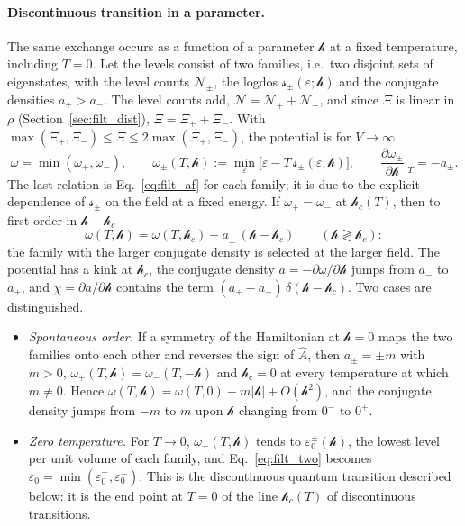 \documentclass[10pt,a4paper]{article}
\theoremstyle{plain}
\newcommand{\cN}{\mathcal{N}}   %
\newcommand{\lndos}{{logdos}}  %
\newcommand{\hfield}{\mathscr{h}}  %
\newcommand{\lds}{\mathscr{s}}  %
\begin{document}
\paragraph{Discontinuous transition in a parameter.} The same exchange
occurs as a function of a parameter $\hfield$ at a fixed temperature,
including $T=0$. Let the levels consist of two families, i.e.\ two disjoint
sets of eigenstates, with the level counts $\cN_\pm$, the \lndos{}
$\lds_\pm(\varepsilon;\hfield)$ and the conjugate densities $a_+>a_-$. The
level counts add, $\cN=\cN_++\cN_-$, and since $\Xi$ is linear in $\rho$
(Section~\ref{sec:filt_dist}), $\Xi=\Xi_++\Xi_-$. With
$\max(\Xi_+,\Xi_-)\le\Xi\le2\max(\Xi_+,\Xi_-)$, the potential is for
$V\to\infty$
\begin{equation}\label{eq:filt_two}
  \omega=\min(\omega_+,\omega_-) ,\qquad
  \omega_\pm(T,\hfield):=\min_\varepsilon\big[\varepsilon-T\,\lds_\pm(\varepsilon;\hfield)\big] ,
  \qquad
  \frac{\partial\omega_\pm}{\partial\hfield}\bigg|_{T}=-a_\pm .
\end{equation}
The last relation is Eq.~\eqref{eq:filt_af} for each family; it is due to
the explicit dependence of $\lds_\pm$ on the field at a fixed energy. If
$\omega_+=\omega_-$ at $\hfield_c(T)$, then to first order in
$\hfield-\hfield_c$
\[
  \omega(T,\hfield)=\omega(T,\hfield_c)-a_\pm\,(\hfield-\hfield_c)
  \qquad(\hfield\gtrless\hfield_c) :
\]
the family with the larger conjugate density is selected at the larger
field. The potential has a kink at $\hfield_c$, the conjugate density
$a=-\partial\omega/\partial\hfield$ jumps from $a_-$ to $a_+$, and
$\chi=\partial a/\partial\hfield$ contains the term
$(a_+-a_-)\,\delta(\hfield-\hfield_c)$. Two cases are distinguished.
\begin{itemize}\setlength{\itemsep}{0pt}
\item \emph{Spontaneous order.} If a symmetry of the Hamiltonian at
  $\hfield=0$ maps the two families onto each other and reverses the sign of
  $\hat A$, then $a_\pm=\pm m$ with $m>0$,
  $\omega_+(T,\hfield)=\omega_-(T,-\hfield)$ and $\hfield_c=0$ at every
  temperature at which $m\neq0$. Hence
  $\omega(T,\hfield)=\omega(T,0)-m|\hfield|+O(\hfield^{2})$, and the conjugate
  density jumps from $-m$ to $m$ upon $\hfield$ changing from $0^-$ to $0^+$.
\item \emph{Zero temperature.} For $T\to0$, $\omega_\pm(T,\hfield)$ tends to
  $\varepsilon_0^{\pm}(\hfield)$, the lowest level per unit volume of each
  family, and Eq.~\eqref{eq:filt_two} becomes
  $\varepsilon_0=\min(\varepsilon_0^{+},\varepsilon_0^{-})$. This is the
  discontinuous quantum transition described below: it is the end point at
  $T=0$ of the line $\hfield_c(T)$ of discontinuous transitions.
\end{itemize}
\end{document}
